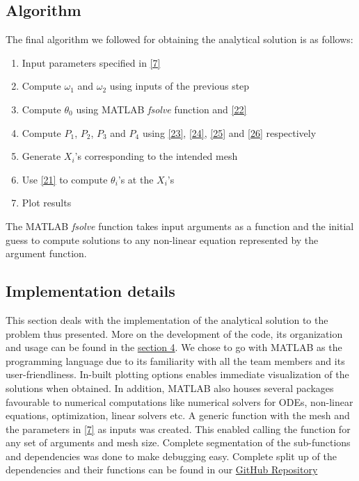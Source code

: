\documentclass[12pt]{article}
\begin{document}
\subsection{Algorithm }
The final algorithm we followed for obtaining the analytical solution is as follows:
\begin{enumerate}
    \item Input parameters specified in \eqref{7}
    \item Compute $\omega_1$ and $\omega_2$ using inputs of the previous step
    \item Compute $\theta_0$ using MATLAB \emph{fsolve} function and \eqref{22}
    \item Compute $P_1$, $P_2$, $P_3$ and $P_4$ using \eqref{23}, \eqref{24}, \eqref{25} and \eqref{26} respectively
    \item Generate $X_i$'s corresponding to the intended mesh
    \item Use \eqref{21} to compute $\theta_i$'s at the $X_i$'s 
    \item Plot results
\end{enumerate}
The MATLAB \emph{fsolve} function takes input arguments as a function and the initial guess to compute solutions to any non-linear equation represented by the argument function. 
\subsection{Implementation details}
This section deals with the implementation of the analytical solution to the problem thus presented. More on the development of the code, its organization and usage can be found in the \hyperref[sec:Code]{section 4}. We chose to go with MATLAB as the programming language due to its familiarity with all the team members and its user-friendliness. In-built plotting options enables immediate visualization of the solutions when obtained. In addition, MATLAB also houses several packages favourable to numerical computations like numerical solvers for ODEs, non-linear equations, optimization, linear solvers etc. A generic function with the mesh and the parameters in \eqref{7} as inputs was created. This enabled calling the function for any set of arguments and mesh size. Complete segmentation of the sub-functions and dependencies was done to make debugging easy. Complete split up of the dependencies and their functions can be found in our \href{https://bit.ly/3wOF5EJ}{GitHub Repository}
\end{document}
